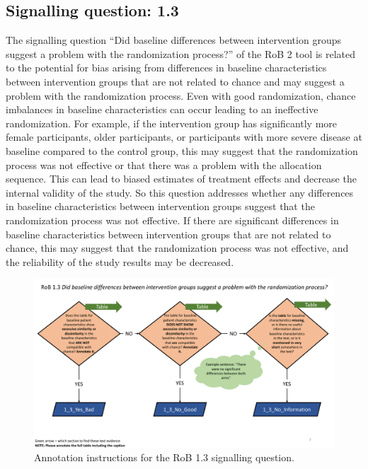 \documentclass[sn-mathphys,Numbered]{sn-jnl}%
\begin{document}
\subsection*{Signalling question: 1.3}
%
The signalling question ``Did baseline differences between intervention groups suggest a problem with the randomization process?'' of the RoB 2 tool is related to the potential for bias arising from differences in baseline characteristics between intervention groups that are not related to chance and may suggest a problem with the randomization process.
Even with good randomization, chance imbalances in baseline characteristics can occur leading to an ineffective randomization.
For example, if the intervention group has significantly more female participants, older participants, or participants with more severe disease at baseline compared to the control group, this may suggest that the randomization process was not effective or that there was a problem with the allocation sequence.
This can lead to biased estimates of treatment effects and decrease the internal validity of the study.
So this question addresses whether any differences in baseline characteristics between intervention groups suggest that the randomization process was not effective.
If there are significant differences in baseline characteristics between intervention groups that are not related to chance, this may suggest that the randomization process was not effective, and the reliability of the study results may be decreased.
%
%
%
\begin{figure}[hbt]
    \centering
    \includegraphics[width=\textwidth]{figures/1_3.pdf}
    \caption{Annotation instructions for the RoB 1.3 signalling question.}
    \label{fig:1_3}
\end{figure}
\end{document}
